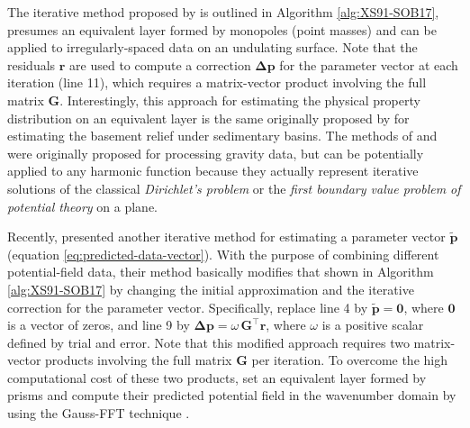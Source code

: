 The iterative method proposed by \citet{siqueira-etal2017} is outlined in Algorithm \ref{alg:XS91-SOB17},
presumes an equivalent layer formed by monopoles (point masses) and can be applied to
irregularly-spaced data on an undulating surface.
Note that the residuals $\mathbf{r}$ are used to compute a correction $\boldsymbol{\Delta}\mathbf{p}$
for the parameter vector at each iteration (line 11), which requires a matrix-vector product involving the 
full matrix $\mathbf{G}$.
Interestingly, this approach for estimating the physical property distribution on an equivalent layer 
is the same originally proposed by \citet{bott1960} for estimating the basement relief under sedimentary basins.
The methods of \citet{xia-sprowl1991} and \citet{siqueira-etal2017} were originally proposed for processing gravity data,
but can be potentially applied to any harmonic function because they actually represent iterative solutions of the 
classical \textit{Dirichlet’s problem} or the \textit{first boundary value problem of potential theory} 
\cite[][ p. 236]{kellogg1967} on a plane.

Recently, \citet{jirigalatu-ebbing2019} presented another iterative method for estimating a parameter 
vector $\tilde{\mathbf{p}}$ (equation \ref{eq:predicted-data-vector}). 
With the purpose of combining different potential-field data, 
their method basically modifies that shown in Algorithm \ref{alg:XS91-SOB17} by changing the initial approximation 
and the iterative correction for the parameter vector.
Specifically, \citet{jirigalatu-ebbing2019} replace line 4 by $\tilde{\mathbf{p}} = \mathbf{0}$, where $\mathbf{0}$ is a vector of zeros,
and line 9 by $\boldsymbol{\Delta}\mathbf{p} = \omega \, \mathbf{G}^{\top} \mathbf{r}$, where $\omega$ is a positive
scalar defined by trial and error.
Note that this modified approach requires two matrix-vector products involving the full matrix $\mathbf{G}$ per iteration.
To overcome the high computational cost of these two products, \citet{jirigalatu-ebbing2019} set an equivalent layer formed by
prisms and compute their predicted potential field in the wavenumber domain by using the Gauss-FFT technique
\cite{zhao-etal2018}.

